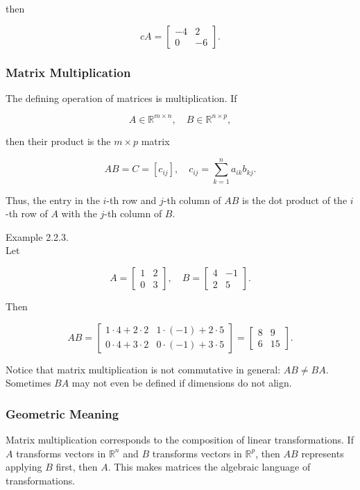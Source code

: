 \documentclass[
  12pt,
  a4paper,
]{article}
\begin{document}
then

\[cA = \begin{bmatrix}
-4 & 2 \\
0 & -6
\end{bmatrix}.\]

\subsubsection{Matrix Multiplication}\label{matrix-multiplication}

The defining operation of matrices is multiplication. If

\[A \in \mathbb{R}^{m \times n}, \quad B \in \mathbb{R}^{n \times p},\]

then their product is the \(m \times p\) matrix

\[AB = C = [c_{ij}], \quad c_{ij} = \sum_{k=1}^n a_{ik} b_{kj}.\]

Thus, the entry in the \(i\)-th row and \(j\)-th column of \(AB\) is the
dot product of the \(i\)-th row of \(A\) with the \(j\)-th column of
\(B\).

Example 2.2.3.\\
Let

\[A = \begin{bmatrix}
1 & 2 \\
0 & 3
\end{bmatrix}, \quad
B = \begin{bmatrix}
4 & -1 \\
2 & 5
\end{bmatrix}.\]

Then

\[AB = \begin{bmatrix}
1\cdot4 + 2\cdot2 & 1\cdot(-1) + 2\cdot5 \\
0\cdot4 + 3\cdot2 & 0\cdot(-1) + 3\cdot5
\end{bmatrix}
=
\begin{bmatrix}
8 & 9 \\
6 & 15
\end{bmatrix}.\]

Notice that matrix multiplication is not commutative in general:
\(AB \neq BA\). Sometimes \(BA\) may not even be defined if dimensions
do not align.

\subsubsection{Geometric Meaning}\label{geometric-meaning}

Matrix multiplication corresponds to the composition of linear
transformations. If \(A\) transforms vectors in \(\mathbb{R}^n\) and
\(B\) transforms vectors in \(\mathbb{R}^p\), then \(AB\) represents
applying \(B\) first, then \(A\). This makes matrices the algebraic
language of transformations.
\end{document}
